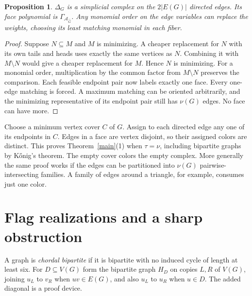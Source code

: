 \documentclass[11pt]{article}
\newtheorem{proposition}[theorem]{Proposition}
\newcommand{\G}{\Gamma}
\newcommand{\A}{\mathcal A}
\begin{document}
\begin{proposition}\label{hered}
$\Delta_G$ is a simplicial complex on the $2|E(G)|$ directed edges. Its face polynomial is $\G_{\A_{\widehat G}}$. Any monomial order on the edge variables can replace the weights, choosing its least matching monomial in each fiber.
\end{proposition}
\begin{proof}
Suppose $N\subseteq M$ and $M$ is minimizing. A cheaper replacement for $N$ with its own tails and heads uses exactly the same vertices as $N$. Combining it with $M\setminus N$ would give a cheaper replacement for $M$. Hence $N$ is minimizing. For a monomial order, multiplication by the common factor from $M\setminus N$ preserves the comparison. Each feasible endpoint pair now labels exactly one face. Every one-edge matching is forced. A maximum matching can be oriented arbitrarily, and the minimizing representative of its endpoint pair still has $\nu(G)$ edges. No face can have more.
\end{proof}

Choose a minimum vertex cover $C$ of $G$. Assign to each directed edge any one of its endpoints in $C$. Edges in a face are vertex disjoint, so their assigned colors are distinct. This proves Theorem~\ref{main}(1) when $\tau=\nu$, including bipartite graphs by K\H{o}nig's theorem. The empty cover colors the empty complex. More generally the same proof works if the edges can be partitioned into $\nu(G)$ pairwise-intersecting families. A family of edges around a triangle, for example, consumes just one color.

\section{Flag realizations and a sharp obstruction}
A graph is \emph{chordal bipartite} if it is bipartite with no induced cycle of length at least six. For $D\subseteq V(G)$ form the bipartite graph $H_D$ on copies $L,R$ of $V(G)$, joining $u_L$ to $v_R$ when $uv\in E(G)$, and also $u_L$ to $u_R$ when $u\in D$. The added diagonal is a proof device.
\end{document}
